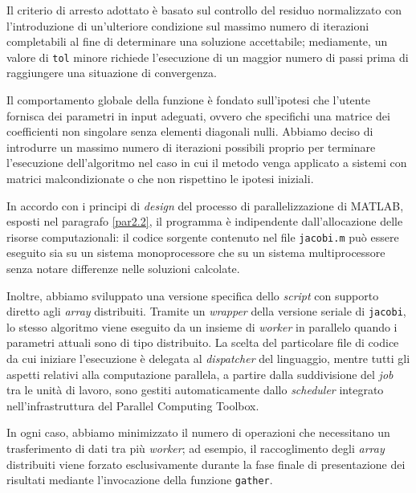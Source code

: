 Il criterio di arresto adottato \`e basato sul controllo del residuo normalizzato con l'introduzione di un'ulteriore condizione sul massimo numero di 
iterazioni completabili al fine di determinare una soluzione accettabile; mediamente, un valore di \lstinline{tol} minore richiede 
l'esecuzione di un maggior numero di passi prima di raggiungere una situazione di convergenza.

Il comportamento globale della funzione \`e fondato sull'ipotesi che l'utente fornisca dei parametri in input adeguati, ovvero che specifichi una matrice dei 
coefficienti non singolare senza elementi diagonali nulli.\newline
Abbiamo deciso di introdurre un massimo numero di iterazioni possibili proprio per terminare l'esecuzione dell'algoritmo nel caso in cui il metodo venga 
applicato a sistemi con matrici malcondizionate o che non rispettino le ipotesi iniziali.

In accordo con i principi di \textit{design} del processo di parallelizzazione di MATLAB, esposti nel paragrafo \ref{par2.2}, il programma \`e 
indipendente dall'allocazione delle risorse computazionali: il codice sorgente contenuto nel file \lstinline{jacobi.m} pu\`o essere eseguito sia su un 
sistema monoprocessore che su un sistema multiprocessore senza notare differenze nelle soluzioni calcolate.

Inoltre, abbiamo sviluppato una versione specifica dello \textit{script} con supporto diretto agli \textit{array} distribuiti.\newline
Tramite un \textit{wrapper} della versione seriale di \lstinline{jacobi}, lo stesso algoritmo viene eseguito da un insieme di \textit{worker} in parallelo 
quando i parametri attuali sono di tipo distribuito.\newline
La scelta del particolare file di codice da cui iniziare l'esecuzione \`e delegata al \textit{dispatcher} del linguaggio, 
mentre tutti gli aspetti relativi alla computazione parallela, a partire dalla suddivisione del \textit{job} tra le unit\`a di lavoro, sono 
gestiti automaticamente dallo \textit{scheduler} integrato nell'infrastruttura del Parallel Computing Toolbox.

In ogni caso, abbiamo minimizzato il numero di operazioni che necessitano un trasferimento di dati tra pi\`u \textit{worker}; ad esempio, 
il raccoglimento degli \textit{array} distribuiti viene forzato esclusivamente durante la fase finale di presentazione dei risultati mediante l'invocazione 
della funzione \lstinline{gather}.

